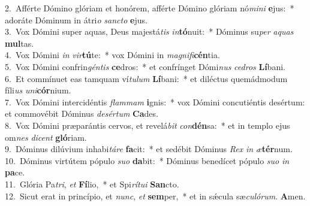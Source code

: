 {2.~}Afférte Dómino glóriam et honórem, afférte Dómino glóriam nó\textit{mi}\textit{ni} \textbf{e}jus:~* adoráte Dóminum in átri\textit{o} \textit{san}\textit{cto} \textbf{e}jus.\\
{3.~}Vox Dómini super aquas, Deus majestá\textit{tis} \textit{in}\textbf{tó}nuit:~* Dóminus su\textit{per} \textit{a}\textit{quas} \textbf{mul}tas.\\
{4.~}Vox Dómini \textit{in} \textit{vir}\textbf{tú}te:~* vox Dómini in \textit{ma}\textit{gni}\textit{fi}\textbf{cén}tia.\\
{5.~}Vox Dómini confrin\textit{gén}\textit{tis} \textbf{ce}dros:~* et confrínget Dómi\textit{nus} \textit{ce}\textit{dros} \textbf{Lí}bani.\\
{6.~}Et commínuet eas tamquam ví\textit{tu}\textit{lum} \textbf{Lí}bani:~* et diléctus quemádmodum fíli\textit{us} \textit{u}\textit{ni}\textbf{cór}nium.\\
{7.~}Vox Dómini intercidéntis \textit{flam}\textit{mam} \textbf{i}gnis:~* vox Dómini concutiéntis desértum: et commovébit Dóminus \textit{de}\textit{sér}\textit{tum} \textbf{Ca}des.\\
{8.~}Vox Dómini præparántis cervos, et revelá\textit{bit} \textit{con}\textbf{dén}sa:~* et in templo ejus om\textit{nes} \textit{di}\textit{cent} \textbf{gló}riam.\\
{9.~}Dóminus dilúvium inhabi\textit{tá}\textit{re} \textbf{fa}cit:~* et sedébit Dóminus \textit{Rex} \textit{in} \textit{æ}\textbf{tér}num.\\
{10.~}Dóminus virtútem pópulo \textit{su}\textit{o} \textbf{da}bit:~* Dóminus benedícet pópulo \textit{su}\textit{o} \textit{in} \textbf{pa}ce.\\
{11.~}Glória Pa\textit{tri}, \textit{et} \textbf{Fí}lio,~* et Spi\textit{rí}\textit{tu}\textit{i} \textbf{San}cto.\\
{12.~}Sicut erat in princípio, et \textit{nunc}, \textit{et} \textbf{sem}per,~* et in sǽcula sæ\textit{cu}\textit{ló}\textit{rum}. \textbf{A}men.\\
